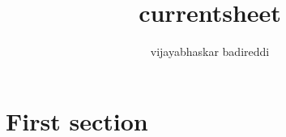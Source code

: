 \documentclass[12pt]{article}
\title{currentsheet}
\author{vijayabhaskar badireddi}
\begin{document}
\section*{First section}

\begin{center}
\begin{tikzfigure}



\end{tikzfigure}
\end{center}
\end{document}
